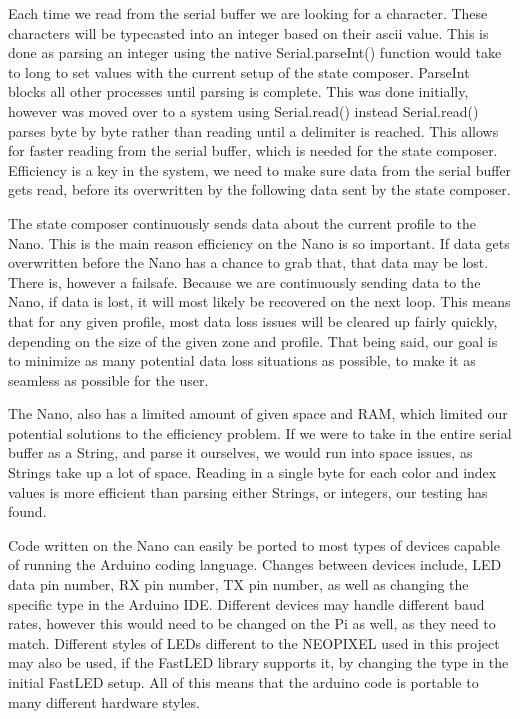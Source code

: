 \documentclass[onecolumn, draftclsnofoot,10pt, compsoc]{IEEEtran}
\begin{document}
	\noindent Each time we read from the serial buffer we are looking for a character. These
	characters will be typecasted into an integer based on their ascii value.
	This is done as parsing an integer using the native Serial.parseInt() function
	would take to long to set values with the current setup of the state composer.
	ParseInt blocks all other processes until parsing is complete. This was done
	initially, however was moved over to a system using Serial.read() instead
	Serial.read() parses byte by byte rather than reading until a delimiter is
	reached. This allows for faster reading from the serial buffer, which is
	needed for the state composer. Efficiency is a key in the system, we need to
	make sure data from the serial buffer gets read, before its overwritten by the
	following data sent by the state composer.

	\noindent The state composer continuously sends data about the current profile to the
	Nano. This is the main reason efficiency on the Nano is so important. If data
	gets overwritten before the Nano has a chance to grab that, that data may be
	lost. There is, however a failsafe. Because we are continuously sending data
	to the Nano, if data is lost, it will most likely be recovered on the next
	loop. This means that for any given profile, most data loss issues will be
	cleared up fairly quickly, depending on the size of the given zone and profile.
	That being said, our goal is to minimize as many potential data loss situations
	as possible, to make it as seamless as possible for the user.

	\noindent The Nano, also has a limited amount of given space and RAM, which limited our
	potential solutions to the efficiency problem. If we were to take in the entire
	serial buffer as a String, and parse it ourselves, we would run into space
	issues, as Strings take up a lot of space. Reading in a single byte for each
	color and index values is more efficient than parsing either Strings, or
	integers, our testing has found.

	\noindent Code written on the Nano can easily be ported to most types of devices capable
	of running the Arduino coding language. Changes between devices include, LED
	data pin number, RX pin number, TX pin number, as well as changing the
	specific type in the Arduino IDE. Different devices may handle different baud
	rates, however this would need to be changed on the Pi as well, as they need to
	match. Different styles of LEDs different to the NEOPIXEL used in this project
	may also be used, if the FastLED library supports it, by changing the type in
	the initial FastLED setup. All of this means that the arduino code is portable
	to many different hardware styles.
\end{document}
